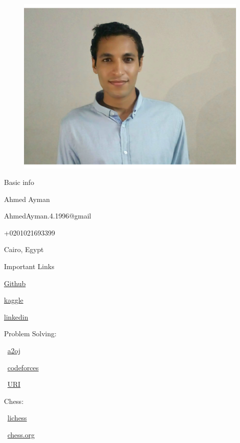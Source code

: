 \documentclass[a4paper,13pt,final]{memoir}
\newcommand{\Sep}{\vspace{1.5em}}
\begin{document}
\begin{figure}
	\hfill
	\includegraphics[width=1\columnwidth]{photo}
	\vspace{-7cm}
\end{figure}


\begin{compactitem}[\color{RoyalBlue}]
	\item {\color{RoyalBlue}Basic info}
	\begin{compactitem}[\color{RoyalBlue}]
		\item Ahmed Ayman
		\item AhmedAyman.4.1996@gmail
		\item +0201021693399
		\item Cairo, Egypt
	\end{compactitem}
	\Sep
	\item Important Links
	\begin{compactitem}[\color{RoyalBlue}$\circ$]
		\item\href{https://github.com/A7medFCIH}{Github}
		\item\href{https://www.kaggle.com/ahmed1234444}{kaggle}
		\item\href{https://www.linkedin.com/in/ahmed-ayman-903814aa}{linkedin}
		\item Problem Solving:
		\begin{compactitem}[\color{RoyalBlue}--]
			\item\ \href{https://a2oj.com/profile?Username=a7med_fcih}{a2oj}
			\item\ \href{http://codeforces.com/profile/a7med.fcih}{codeforces}
			\item\ \href{https://www.urionlinejudge.com.br/judge/en/profile/35562}{URI}
		\end{compactitem}
		\item Chess:
		\begin{compactitem}[\color{RoyalBlue}--]
			\item\ \href{https://lichess.org/@/Ahmed_fcih}{lichess}
			\item\ \href{https://www.chess.com/member/a7med_fcih}{chess.org}
		\end{compactitem}
	\end{compactitem}
\end{compactitem}
\end{document}
